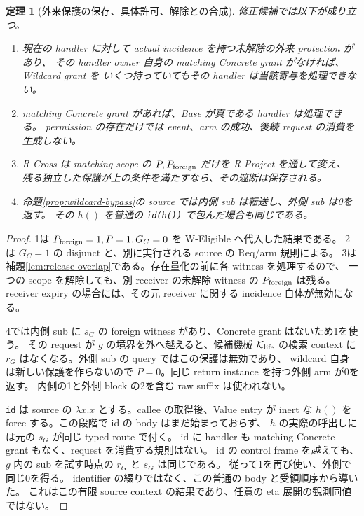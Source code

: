 \documentclass[11pt,a4paper]{article}
\newtheorem{theorem}[definition]{定理}
\newcommand{\Core}{\mathcal K}
\begin{document}
\begin{theorem}[外来保護の保存、具体許可、解除との合成]
\label{thm:wildcard-hygiene}
修正候補では以下が成り立つ。
\begin{enumerate}
\item 現在の handler に対して actual incidence を持つ未解除の外来 protection があり、
その handler owner 自身の matching Concrete grant がなければ、Wildcard grant を
いくつ持っていてもその handler は当該寄与を処理できない。
\item matching Concrete grant があれば、Base が真である handler は処理できる。
permission の存在だけでは event、arm の成功、後続 request の消費を生成しない。
\item R-Cross は matching scope の \(P,P_{\rm foreign}\) だけを R-Project を通して変え、
残る独立した保護が上の条件を満たすなら、その遮断は保存される。
\item 命題\ref{prop:wildcard-bypass}の source では内側 sub は転送し、外側 sub は0を返す。
その \(h()\) を普通の \texttt{id(h())} で包んだ場合も同じである。
\end{enumerate}
\end{theorem}
\begin{proof}
1は \(P_{\rm foreign}=1,P=1,G_C=0\) を W-Eligible へ代入した結果である。
2は \(G_C=1\) の disjunct と、別に実行される source の Req/arm 規則による。
3は補題\ref{lem:release-overlap}である。存在量化の前に各 witness を処理するので、
一つの scope を解除しても、別 receiver の未解除 witness の \(P_{\rm foreign}\) は残る。
receiver expiry の場合には、その元 receiver に関する incidence 自体が無効になる。

4では内側 sub に \(s_G\) の foreign witness があり、Concrete grant はないため1を使う。
その request が \(g\) の境界を外へ越えると、候補機械 \(\Core_{\rm life}\) の検索 context に
\(r_G\) はなくなる。外側 sub の query ではこの保護は無効であり、
wildcard 自身は新しい保護を作らないので \(P=0\)。同じ return instance を持つ外側 arm が0を返す。
内側の1と外側 block の2を含む raw suffix は使われない。

\texttt{id} は source の \(\lambda x.x\) とする。callee の取得後、Value entry が inert な
\(h()\) を force する。この段階で id の body はまだ始まっておらず、
\(h\) の実際の呼出しには元の \(s_G\) が同じ typed route で付く。
id に handler も matching Concrete grant もなく、request を消費する規則はない。
id の control frame を越えても、\(g\) 内の sub を試す時点の \(r_G\) と \(s_G\) は同じである。
従って1を再び使い、外側で同じ0を得る。
identifier の綴りではなく、この普通の body と受領順序から導いた。
これはこの有限 source context の結果であり、任意の eta 展開の観測同値ではない。
\end{proof}
\end{document}
